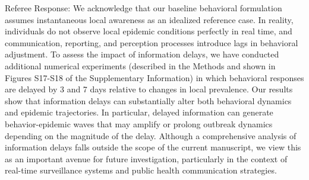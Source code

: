 \documentclass[9pt,twocolumn,twoside]{pnas-new}
\newcommand{\green}[1]{{\textcolor{green!50!black}{#1}}}
\begin{document}
\green{Referee Response: We acknowledge that our baseline behavioral formulation assumes instantaneous local awareness as an idealized reference case. In reality, individuals do not observe local epidemic conditions perfectly in real time, and communication, reporting, and perception processes introduce lags in behavioral adjustment. To assess the impact of information delays, we have conducted additional numerical experiments (described in the Methods and shown in Figures S17-S18 of the Supplementary Information) in which behavioral responses are delayed by 3 and 7 days relative to changes in local prevalence. Our results show that information delays can substantially alter both behavioral dynamics and epidemic trajectories. In particular, delayed information can generate behavior-epidemic waves that may amplify or prolong outbreak dynamics depending on the magnitude of the delay. Although a comprehensive analysis of information delays falls outside the scope of the current manuscript, we view this as an important avenue for future investigation, particularly in the context of real-time surveillance systems and public health communication strategies.}


\end{document}
